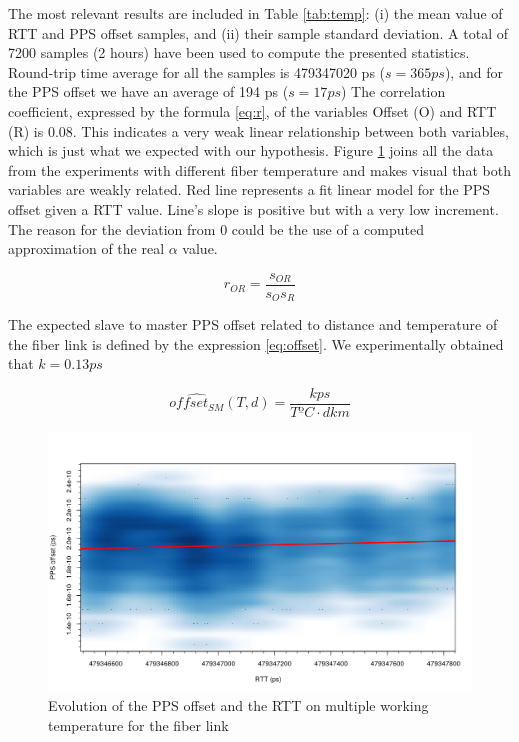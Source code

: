 The most relevant results are included in Table \ref{tab:temp}: (i) the mean 
value of RTT and PPS offset samples, and (ii) their sample standard deviation. 
A total of 7200 samples (2 hours) have been used to compute the presented 
statistics. Round-trip time average for all the samples is 479347020 ps ($s=365 
ps$), and for the PPS offset we have an average of 194 ps ($s=17 ps$)
The correlation coefficient, expressed by the formula \ref{eq:r}, of the 
variables Offset (O) and RTT (R) is 0.08. This indicates a very weak linear 
relationship between both variables, which is just what we expected with our 
hypothesis.
Figure \ref{fig:ppsvsrtt} joins all the data from the experiments with 
different fiber temperature and makes visual that both variables are weakly 
related. Red line represents a fit linear model for the PPS offset given a RTT 
value. Line's slope is positive but with a very low increment. The reason for 
the deviation from 0 could be the use of a computed approximation of the real 
$\alpha$ value. 

\begin{equation}\label{eq:r}
r_{OR} = \frac{s_{OR}}{s_{O} s_{R}}
\end{equation}

The expected slave to master PPS offset related to distance and temperature of 
the fiber link is defined by the expression \ref{eq:offset}. We experimentally 
obtained that $k=0.13 ps$ 

\begin{equation}\label{eq:offset}
	\hat{offset_{SM}} (T,d) = \frac {k ps} {T ºC \cdot d km}
\end{equation}

\begin{figure}
	\centering
	\includegraphics[width=1\linewidth]{img/ppsvsrtt}
	\caption[Evolution of the PPS offset and the RTT on multiple working 
	temperature for the fiber link]{Evolution of the PPS offset and the RTT on 
	multiple working temperature for the fiber link}
	\label{fig:ppsvsrtt}
\end{figure}
